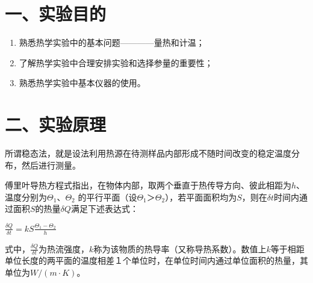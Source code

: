 \documentclass[11pt,a4paper,oneside]{article}
\begin{document}
\section*{一、实验目的}
\begin{enumerate}
\item 熟悉热学实验中的基本问题————量热和计温；
\item 了解热学实验中合理安排实验和选择参量的重要性；
\item 熟悉热学实验中基本仪器的使用。
\end{enumerate}

\section*{二、实验原理}
所谓稳态法，就是设法利用热源在待测样品内部形成不随时间改变的稳定温度分布，然后进行测量。

傅里叶导热方程式指出，在物体内部，取两个垂直于热传导方向、彼此相距为$h$、温度分别为$\Theta _1$、$\Theta _2$ 的平行平面（设$\Theta _1$＞$\Theta _2$），若平面面积均为$S$，则在$\delta t$时间内通过面积$S$的热量$\delta Q$满足下述表达式：
\begin{center}
$\displaystyle\frac{\delta Q}{\delta t}=kS\displaystyle\frac{\Theta _1-\Theta _2}{h} $
\end{center}
式中，$ \displaystyle\frac{\delta Q}{\delta t}$为热流强度，$k$称为该物质的热导率（又称导热系数）。数值上$k$等于相距单位长度的两平面的温度相差１个单位时，在单位时间内通过单位面积的热量，其单位为$ W/(m\cdot K)$。
\end{document}
